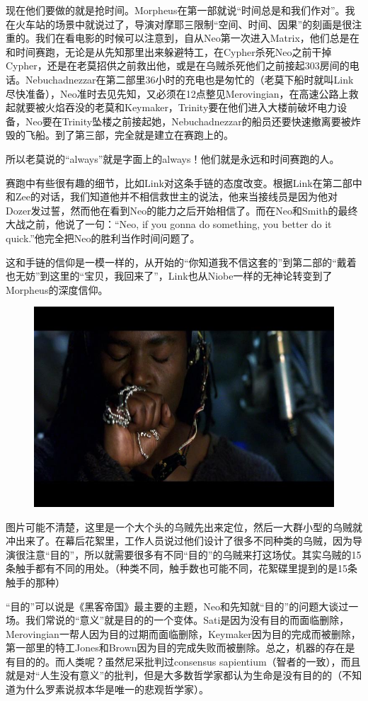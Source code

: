 \documentclass[UTF8]{ctexart}
\begin{document}
现在他们要做的就是抢时间。Morpheus在第一部就说“时间总是和我们作对”。我在火车站的场景中就说过了，导演对摩耶三限制“空间、时间、因果”的刻画是很注重的。我们在看电影的时候可以注意到，自从Neo第一次进入Matrix，他们总是在和时间赛跑，无论是从先知那里出来躲避特工，在Cypher杀死Neo之前干掉Cypher，还是在老莫招供之前救出他，或是在乌贼杀死他们之前接起303房间的电话。Nebuchadnezzar在第二部里36小时的充电也是匆忙的（老莫下船时就叫Link尽快准备），Neo准时去见先知，又必须在12点整见Merovingian，在高速公路上救起就要被火焰吞没的老莫和Keymaker，Trinity要在他们进入大楼前破坏电力设备，Neo要在Trinity坠楼之前接起她，Nebuchadnezzar的船员还要快速撤离要被炸毁的飞船。到了第三部，完全就是建立在赛跑上的。

所以老莫说的“always”就是字面上的always！他们就是永远和时间赛跑的人。

赛跑中有些很有趣的细节，比如Link对这条手链的态度改变。根据Link在第二部中和Zee的对话，我们知道他并不相信救世主的说法，他来当接线员是因为他对Dozer发过誓，然而他在看到Neo的能力之后开始相信了。而在Neo和Smith的最终大战之前，他说了一句：“Neo, if you gonna do something, you better do it quick.”他完全把Neo的胜利当作时间问题了。

这和手链的信仰是一模一样的，从开始的“你知道我不信这套的”到第二部的“戴着也无妨”到这里的“宝贝，我回来了”，Link也从Niobe一样的无神论转变到了Morpheus的深度信仰。

\begin{figure}[htb]
\centering
\includegraphics[width=0.5\linewidth]{fig/aea59e3d72117d00bba16754.jpg}
\end{figure}

图片可能不清楚，这里是一个大个头的乌贼先出来定位，然后一大群小型的乌贼就冲出来了。在幕后花絮里，工作人员说过他们设计了很多不同种类的乌贼，因为导演很注意“目的”，所以就需要很多有不同“目的”的乌贼来打这场仗。其实乌贼的15条触手都有不同的用处。（种类不同，触手数也可能不同，花絮碟里提到的是15条触手的那种）

“目的”可以说是《黑客帝国》最主要的主题，Neo和先知就“目的”的问题大谈过一场。我们常说的“意义”就是目的的一个变体。Sati是因为没有目的而面临删除，Merovingian一帮人因为目的过期而面临删除，Keymaker因为目的完成而被删除，第一部里的特工Jones和Brown因为目的完成失败而被删除。总之，机器的存在是有目的的。而人类呢？虽然尼采批判过consensus sapientium（智者的一致），而且就是对“人生没有意义”的批判，但是大多数哲学家都认为生命是没有目的的（不知道为什么罗素说叔本华是唯一的悲观哲学家）。
\end{document}
